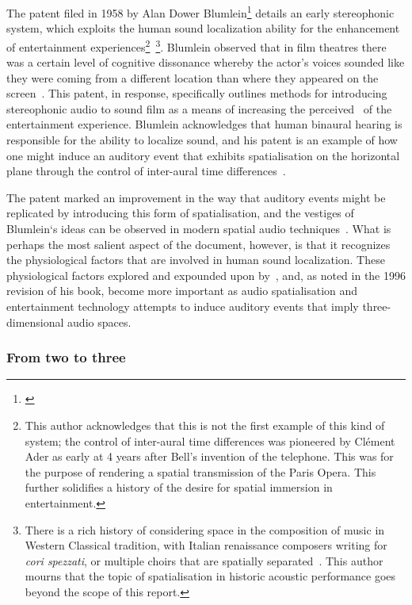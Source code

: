 The patent filed in 1958 by Alan Dower Blumlein\footnote{\citep{blumlein-patent}} details an early stereophonic system, which exploits the human sound localization ability for the enhancement of entertainment experiences\footnote{This author acknowledges that this is not the first example of this kind of system; the control of inter-aural time differences was pioneered by Cl\'ement Ader as early at 4 years after Bell's invention of the telephone. This was for the purpose of rendering a spatial transmission of the Paris Opera. This further solidifies a history of the desire for spatial immersion in entertainment.}~\footnote{There is a rich history of considering space in the composition of music in Western Classical tradition, with Italian renaissance composers writing for \textit{cori spezzati}, or multiple choirs that are spatially separated~\citep{spezzati}. This author mourns that the topic of spatialisation in historic acoustic performance goes beyond the scope of this report.}.
Blumlein observed that in film theatres there was a certain level of cognitive dissonance whereby the actor’s voices sounded like they were coming from a different location than where they appeared on the screen~\citep{alexander_blumlein}.
This patent, in response, specifically outlines methods for introducing stereophonic audio to sound film as a means of increasing the perceived~ of the entertainment experience.
Blumlein acknowledges that human binaural hearing is responsible for the ability to localize sound, and his patent is an example of how one might induce an auditory event that exhibits spatialisation on the horizontal plane through the control of inter-aural time differences~\citep{blumlein-patent}.

The patent marked an improvement in the way that auditory events might be replicated by introducing this form of spatialisation, and the vestiges of Blumlein`s ideas can be observed in modern spatial audio techniques~\citep{spatial_techniques, beyer_acoustics}.
What is perhaps the most salient aspect of the document, however, is that it recognizes the physiological factors that are involved in human sound localization.
These physiological factors explored and expounded upon by~\citet{blauert_spatial}, and, as noted in the 1996 revision of his book, become more important as audio spatialisation and entertainment technology attempts to induce auditory events that imply three-dimensional audio spaces.

\subsubsection{From two to three}

